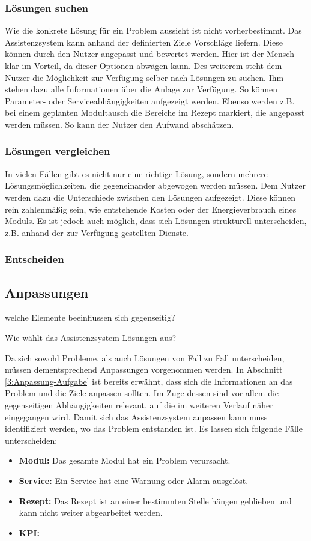 \subsubsection*{Lösungen suchen }
Wie die konkrete Lösung für ein Problem aussieht ist nicht vorherbestimmt. Das Assistenzsystem kann anhand der definierten Ziele Vorschläge liefern. Diese können durch den Nutzer angepasst und bewertet werden. Hier ist der Mensch klar im Vorteil, da dieser Optionen abwägen kann. Des weiterem steht dem Nutzer die Möglichkeit zur Verfügung selber nach Lösungen zu suchen. Ihm stehen dazu alle Informationen über die Anlage zur Verfügung. So können Parameter- oder Serviceabhängigkeiten aufgezeigt werden. Ebenso werden z.B. bei einem geplanten Modultausch die Bereiche im Rezept markiert, die angepasst werden müssen. So kann der Nutzer den Aufwand abschätzen.

\subsubsection*{Lösungen vergleichen}
In vielen Fällen gibt es nicht nur eine richtige Lösung, sondern mehrere Lösungsmöglichkeiten, die gegeneinander abgewogen werden müssen. Dem Nutzer werden dazu die Unterschiede zwischen den Lösungen aufgezeigt. Diese können rein zahlenmäßig sein, wie entstehende Kosten oder der Energieverbrauch eines Moduls. Es ist jedoch auch möglich, dass sich Lösungen strukturell unterscheiden, z.B. anhand der zur Verfügung gestellten Dienste.

\subsubsection*{Entscheiden}

\subsection{Anpassungen}
welche Elemente beeinflussen sich gegenseitig?

Wie wählt das Assistenzsystem Lösungen aus?

Da sich sowohl Probleme, als auch Lösungen von Fall zu Fall unterscheiden, müssen dementsprechend Anpassungen vorgenommen werden. In Abschnitt \ref{3:Anpassung-Aufgabe} ist bereits erwähnt, dass sich die Informationen an das Problem und die Ziele anpassen sollten. Im Zuge dessen sind vor allem die gegenseitigen Abhängigkeiten relevant, auf die im weiteren Verlauf näher eingegangen wird. Damit sich das Assistenzsystem anpassen kann muss identifiziert werden, wo das Problem entstanden ist. Es lassen sich folgende Fälle unterscheiden:
\begin{itemize}
\item \textbf{Modul:} Das gesamte Modul hat ein Problem verursacht.
\item \textbf{Service:} Ein Service hat eine Warnung oder Alarm ausgelöst.
\item \textbf{Rezept:} Das Rezept ist an einer bestimmten Stelle hängen geblieben und kann nicht weiter abgearbeitet werden.
\item \textbf{KPI:} 
\end{itemize}

